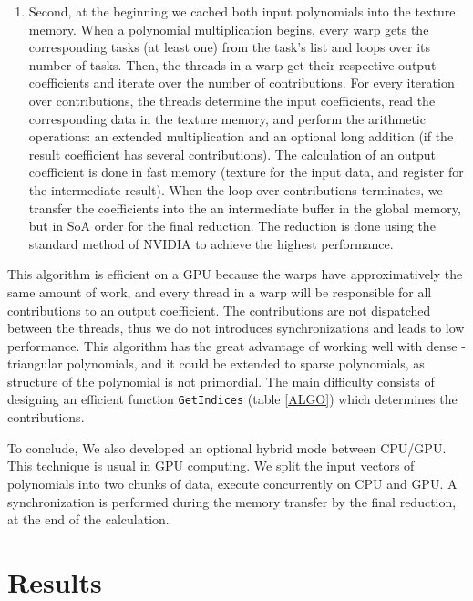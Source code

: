 \documentclass[oribibl]{llncs2e/llncs}
\begin{document}
\begin{enumerate}
\item  Second, at the beginning we  cached both input polynomials into the texture memory. 
When a polynomial multiplication begins,  every warp gets the corresponding tasks (at least one) from the task's list and loops over its number of tasks. Then,
the threads in a warp get their respective output coefficients and iterate over the number of  contributions.
For every iteration over contributions, the threads determine the input coefficients, read the corresponding data in the texture memory, and perform the arithmetic operations: an extended multiplication and an optional long addition (if the result coefficient has several contributions). The calculation of an output coefficient  is  done in fast memory (texture for the input data, and register for the intermediate result). 
When the loop over contributions terminates,  we transfer the coefficients into the an intermediate buffer in the global memory, but in SoA  order for the final reduction. 
The reduction is done using the standard method of NVIDIA \cite{CUDAReduction} to achieve the highest performance.




\end{enumerate}


This algorithm is efficient on a GPU because the warps have approximatively the same amount of work,  and every thread in a warp will be responsible for all contributions to an output coefficient.
The contributions are not dispatched between the threads, thus we do not  introduces   synchronizations and leads to low performance. 
This  algorithm has the great advantage of working well with dense - triangular polynomials, and it could be extended to sparse polynomials, as structure of the polynomial is not primordial.
The main difficulty consists  of designing an efficient function \texttt{GetIndices} (table \ref{ALGO}) which determines the contributions.

To conclude,  We also developed an optional hybrid mode between CPU/GPU. This  technique is usual in GPU computing.
We split the input vectors of polynomials into two chunks of data, execute concurrently on CPU and GPU. 
A synchronization  is performed during  the memory transfer   by the final reduction, at the end of the calculation.

\section{Results}
\end{document}
